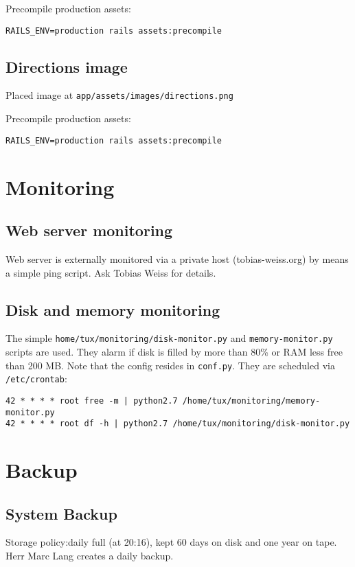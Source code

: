 \documentclass{article}
\begin{document}
Precompile production assets:
\begin{lstlisting}
RAILS_ENV=production rails assets:precompile
\end{lstlisting}


\subsection{Directions image}
Placed image at \verb|app/assets/images/directions.png|

Precompile production assets:
\begin{lstlisting}
RAILS_ENV=production rails assets:precompile
\end{lstlisting}

\section{Monitoring}
\subsection{Web server monitoring}
Web server is externally monitored via a private host (tobias-weiss.org) by means a simple ping script.
Ask Tobias Weiss for details.

\subsection{Disk and memory monitoring}
The simple \verb|home/tux/monitoring/disk-monitor.py| and \verb|memory-monitor.py| scripts are used.
They alarm if disk is filled by more than 80\% or RAM less free than 200 MB.
Note that the config resides in \verb|conf.py|.
They are scheduled via \verb|/etc/crontab|:
\begin{lstlisting}
42 * * * * root free -m | python2.7 /home/tux/monitoring/memory-monitor.py
42 * * * * root df -h | python2.7 /home/tux/monitoring/disk-monitor.py
\end{lstlisting}

\section{Backup}
\subsection{System Backup}
Storage policy:daily full (at 20:16), kept 60 days on disk and one year on tape.
Herr Marc Lang creates a daily backup.
\end{document}
